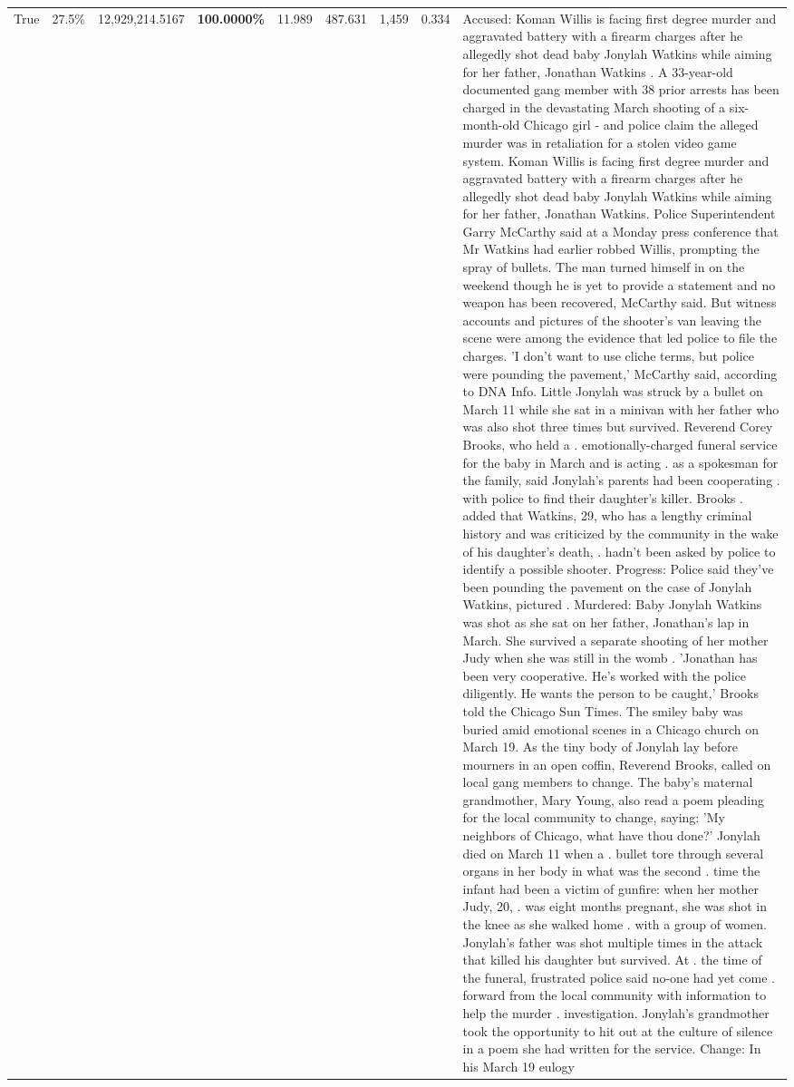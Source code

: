 \begin{table}[H]
\begin{tabular}{lllrlllll}
True & 27.5\% & 12,929,214.5167 & \bfseries \color{red} 100.0000\% & 11.989 & 487.631 & 1,459 & 0.334 & Accused: Koman Willis is facing first degree murder and aggravated battery with a firearm charges after he allegedly shot dead baby Jonylah Watkins while aiming for her father, Jonathan Watkins . A 33-year-old documented gang member with 38 prior arrests has been charged in the devastating March shooting of a six-month-old Chicago girl - and police claim the alleged murder was in retaliation for a stolen video game system. Koman Willis is facing first degree murder and aggravated battery with a firearm charges after he allegedly shot dead baby Jonylah Watkins while aiming for her father, Jonathan Watkins. Police Superintendent Garry McCarthy said at a Monday press conference that Mr Watkins had earlier robbed Willis, prompting the spray of bullets. The man turned himself in on the weekend though he is yet to provide a statement and no weapon has been recovered, McCarthy said. But witness accounts and pictures of the shooter's van leaving the scene were among the evidence that led police to file the charges. 'I don't want to use cliche terms, but police were pounding the pavement,' McCarthy said, according to DNA Info. Little Jonylah was struck by a bullet on March 11 while she sat in a minivan with her father who was also shot three times but survived. Reverend Corey Brooks, who held a . emotionally-charged funeral service for the baby in March and is acting . as a spokesman for the family, said Jonylah's parents had been cooperating . with police to find their daughter's killer. Brooks . added that Watkins, 29, who has a lengthy criminal history and was criticized by the community in the wake of his daughter's death, . hadn't been asked by police to identify a possible shooter. Progress: Police said they've been pounding the pavement on the case of Jonylah Watkins, pictured . Murdered: Baby Jonylah Watkins was shot as she sat on her father, Jonathan's lap in March. She survived a separate shooting of her mother Judy when she was still in the womb . 'Jonathan has been very cooperative. He's worked with the police diligently. He wants the person to be caught,' Brooks told the Chicago Sun Times. The smiley baby was buried amid emotional scenes in a Chicago church on March 19. As the tiny body of Jonylah lay before mourners in an open coffin, Reverend Brooks, called on local gang members to change. The baby's maternal grandmother, Mary Young, also read a poem pleading for the local community to change, saying: 'My neighbors of Chicago, what have thou done?' Jonylah died on March 11 when a . bullet tore through several organs in her body in what was the second . time the infant had been a victim of gunfire: when her mother Judy, 20, . was eight months pregnant, she was shot in the knee as she walked home . with a group of women. Jonylah's father was shot multiple times in the attack that killed his daughter but survived. At . the time of the funeral, frustrated police said no-one had yet come . forward from the local community with information to help the murder . investigation. Jonylah's grandmother took the opportunity to hit out at the culture of silence in a poem she had written for the service. Change: In his March 19 eulogy 
\end{tabular}
\end{table}

